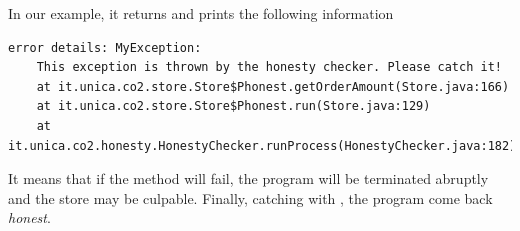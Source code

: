 In our example, it returns  and prints the following information
\begin{mdframed}
  \begin{verbatim}
error details: MyException: 
    This exception is thrown by the honesty checker. Please catch it!
    at it.unica.co2.store.Store$Phonest.getOrderAmount(Store.java:166)
    at it.unica.co2.store.Store$Phonest.run(Store.java:129)
    at it.unica.co2.honesty.HonestyChecker.runProcess(HonestyChecker.java:182)
  \end{verbatim}
\end{mdframed}
It means that if the method  will fail,
the program will be terminated abruptly and the store may be culpable.
Finally, catching  with ,
the program come back \emph{honest}.





